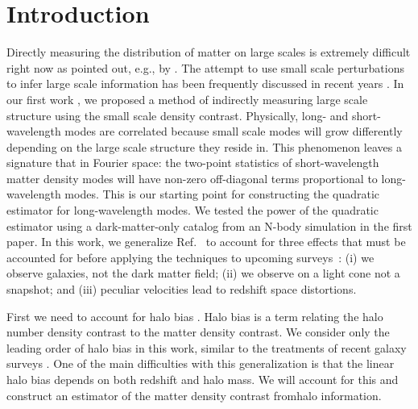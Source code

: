 \documentclass[prd,amsmath,amssymb,floatfix,superscriptaddress,nofootinbib,twocolumn]{revtex4-1}
\begin{document}
\section{Introduction} \label{sec1}
\noindent Directly measuring the distribution of matter on large scales is extremely difficult right now as pointed out, e.g., by \cite{Modi:2019hydr}. The attempt to use small scale perturbations to infer large scale information has been frequently discussed in recent years \cite{Baldauf:2011fer}\cite{Jeong:2012foss}\cite{Li:2014ssc}\cite{Zhu:2016tidal}\cite{Barreira:2017res}. In our first work \cite{Li:2020fir}, we proposed a method of indirectly measuring large scale structure using the small scale density contrast. Physically, long- and short-wavelength modes are correlated because small scale modes will grow differently depending on the large scale structure they reside in. This phenomenon leaves a signature that in Fourier space: the two-point statistics of short-wavelength matter density modes will have non-zero off-diagonal terms proportional to long-wavelength modes. This is our starting point for constructing the quadratic estimator for long-wavelength modes. We tested the power of the quadratic estimator using a dark-matter-only catalog from an N-body simulation in the first paper. In this work, we generalize Ref.~\cite{Li:2020fir} to account for three effects that must be accounted for before applying the techniques to upcoming surveys~\cite{LSST:2012ls}\cite{Wfirst:2012jg}\cite{DESI:2019ds}: (i) we observe galaxies, not the dark matter field; (ii) we observe on a light cone not a snapshot; and (iii) peculiar velocities lead to redshift space distortions.

First we need to account for halo bias \cite{Kravtsov:1999hb}\cite{Desjacques:2018rev} . Halo bias is a term relating the halo number density contrast to the matter density contrast. We consider only the leading order of halo bias in this work, similar to the treatments of recent galaxy surveys \cite{Seljak:2004sj}\cite{Chang:2016npo}\cite{Prat:2016xor}. One of the main difficulties with this generalization is that the linear halo bias depends on both redshift and halo mass. We will account for this and construct an estimator of the matter density contrast fromhalo information.
\end{document}
